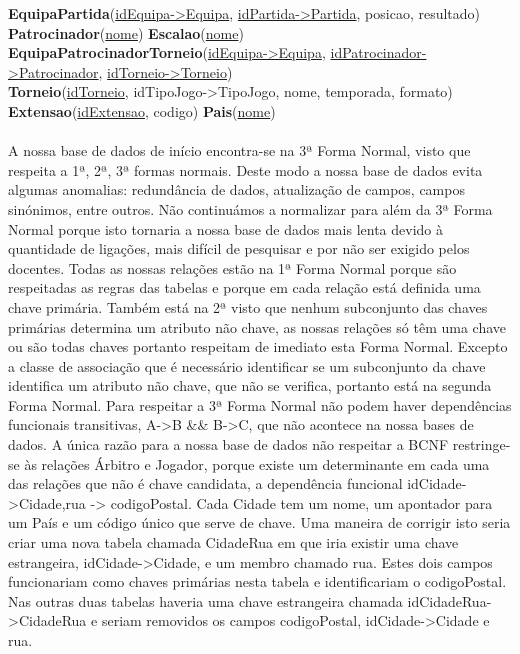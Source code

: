 \documentclass[a4paper]{article}
\begin{document}
\textbf{EquipaPartida}(\underline{idEquipa->Equipa}, \underline{idPartida->Partida}, posicao, resultado) \\
\textbf{Patrocinador}(\underline{nome}) \textbf{Escalao}(\underline{nome}) \\
\textbf{EquipaPatrocinadorTorneio}(\underline{idEquipa->Equipa}, \underline{idPatrocinador->Patrocinador}, \underline{idTorneio->Torneio}) \\
\textbf{Torneio}(\underline{idTorneio}, idTipoJogo->TipoJogo, nome, temporada, formato) \\
\textbf{Extensao}(\underline{idExtensao}, codigo) \textbf{Pais}(\underline{nome}) \\
\\\newline
A nossa base de dados de início encontra-se na 3ª Forma Normal, visto que respeita a 1ª, 2ª, 3ª formas normais. Deste modo a nossa base de dados evita algumas anomalias: redundância de dados, atualização de campos, campos sinónimos, entre outros. Não continuámos a normalizar para além da 3ª Forma Normal porque isto tornaria a nossa base de dados mais lenta devido à quantidade de ligações, mais difícil de pesquisar e por não ser exigido pelos docentes. Todas as nossas relações estão na 1ª Forma Normal porque são respeitadas as regras das tabelas e porque em cada relação está definida uma chave primária. Também está na 2ª visto que nenhum subconjunto das chaves primárias determina um atributo não chave, as nossas relações só têm uma chave ou são todas chaves portanto respeitam de imediato esta Forma Normal. Excepto a classe de associação que é necessário identificar se um subconjunto da chave identifica um atributo não chave, que não se verifica, portanto está na segunda Forma Normal. Para respeitar a 3ª Forma Normal não podem haver dependências funcionais transitivas, A->B \&\& B->C, que não acontece na nossa bases de dados. A única razão para a nossa base de dados não respeitar a BCNF restringe-se às relações Árbitro e Jogador, porque existe um determinante em cada uma das relações que não é chave candidata, a dependência funcional idCidade->Cidade,rua -> codigoPostal. Cada Cidade tem um nome, um apontador para um País e um código único que serve de chave. Uma maneira de corrigir isto seria criar uma nova tabela chamada CidadeRua em que iria existir uma chave estrangeira, idCidade->Cidade, e um membro chamado rua. Estes dois campos funcionariam como chaves primárias nesta tabela e identificariam o codigoPostal. Nas outras duas tabelas haveria uma chave estrangeira chamada idCidadeRua->CidadeRua e seriam removidos os campos codigoPostal, idCidade->Cidade e rua.
\end{document}
